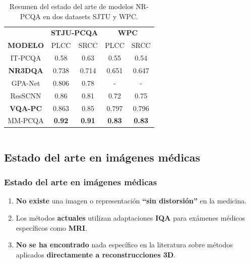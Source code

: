 \begin{frame}
\begin{columns}
      \begin{table}[htp]
          \footnotesize
          \centering
          \begin{tabular}{|c|c|c|c|c|}
              \hline
              \rowcolor[HTML]{FFC702}
              \cellcolor[HTML]{FFC702} & \multicolumn{2}{c|}{\cellcolor[HTML]{FFC702}\textbf{STJU-PCQA}} & \multicolumn{2}{c|}{\cellcolor[HTML]{FFC702}\textbf{WPC}} \\ 
              \cline{2-5}
             \multirow{-2}{*}{\cellcolor[HTML]{FFC702}\textbf{MODELO}}  &\multicolumn{1}{c|}{\cellcolor[HTML]{FFC702} PLCC} & \multicolumn{1}{c|}{\cellcolor[HTML]{FFC702}SRCC} & \multicolumn{1}{c|}{\cellcolor[HTML]{FFC702}PLCC} & \multicolumn{1}{c|}{\cellcolor[HTML]{FFC702}SRCC} \\
              \hline
              IT-PCQA & 0.58 & 0.63 & 0.55  & 0.54\\
              \hline
              \textbf<2->{NR3DQA} & 0.738 & 0.714 & 0.651 & 0.647\\
              \hline
              GPA-Net & 0.806 & 0.78 & - & - \\
              \hline
              ResSCNN & 0.86 & 0.81 & 0.72 & 0.75\\
              \hline
              \textbf<3->{VQA-PC} & 0.863 & 0.85 & 0.797 & 0.796\\
              \hline
              MM-PCQA & \textbf{0.92} & \textbf{0.91} & \textbf{0.83} & \textbf{0.83}\\
              \hline
          \end{tabular}
          \caption[Estado del arte de modelos NR-PCQA]{
          Resumen del estado del arte de modelos NR-PCQA en dos datasets SJTU y WPC.
        }
      \end{table}
  \end{columns}
\end{frame}

\subsection{Estado del arte en imágenes médicas}
\begin{frame}
  \frametitle{Estado del arte en imágenes médicas}
  \begin{enumerate}
    \item \textbf{No existe} una imagen o representación \textbf{``sin distorsión''} en la medicina.
    \item Los métodos \textbf{actuales} utilizan adaptaciones \textbf{IQA} para 
      exámenes médicos específicos como \textbf{MRI}.
    \item \textbf{No se ha encontrado} nada específico en la literatura sobre 
      métodos aplicados \textbf{directamente a reconstrucciones 3D}.
  \end{enumerate}
\end{frame}
